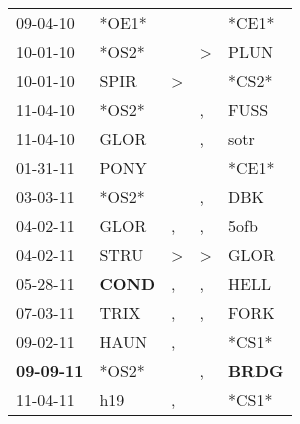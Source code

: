 \begin{supertabular}{p{0.07\textwidth}p{0.06\textwidth}p{0.02\textwidth}p{0.02\textwidth}p{0.06\textwidth}}
          09-04-10\textsuperscript{} &                            *OE1* &                  &                  &                            *CE1* \\
          10-01-10\textsuperscript{} &                            *OS2* &                  &     \textgreater &           PLUN\textsuperscript{} \\
          10-01-10\textsuperscript{} &           SPIR\textsuperscript{} &     \textgreater &                  &                            *CS2* \\
          11-04-10\textsuperscript{} &                            *OS2* &                  &                , &           FUSS\textsuperscript{} \\
          11-04-10\textsuperscript{} &           GLOR\textsuperscript{} &                  &                , &           sotr\textsuperscript{} \\
          01-31-11\textsuperscript{} &           PONY\textsuperscript{} &                  &                  &                            *CE1* \\
          03-03-11\textsuperscript{} &                            *OS2* &                  &                , &            DBK\textsuperscript{} \\
          04-02-11\textsuperscript{} &           GLOR\textsuperscript{} &                , &                , &           5ofb\textsuperscript{} \\
          04-02-11\textsuperscript{} &           STRU\textsuperscript{} &     \textgreater &     \textgreater &           GLOR\textsuperscript{} \\
          05-28-11\textsuperscript{} &  \textbf{COND\textsuperscript{}} &                , &                , &           HELL\textsuperscript{} \\
          07-03-11\textsuperscript{} &           TRIX\textsuperscript{} &                , &                , &           FORK\textsuperscript{} \\
          09-02-11\textsuperscript{} &           HAUN\textsuperscript{} &                , &                  &                            *CS1* \\
 \textbf{09-09-11\textsuperscript{}} &                            *OS2* &                  &                , &  \textbf{BRDG\textsuperscript{}} \\
          11-04-11\textsuperscript{} &            h19\textsuperscript{} &                , &                  &                            *CS1* \\

\end{supertabular}
